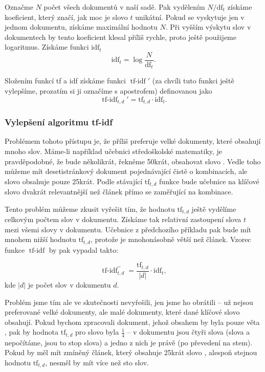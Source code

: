 \documentclass{article}
\DeclareMathOperator{\tfidf}{tf-idf}
\begin{document}
Označme $N$ počet všech dokumentů v naší sadě. Pak vydělením $N/\mbox{df}_t$ získáme koeficient, který značí, jak moc je slovo $t$ unikátní. Pokud se vyskytuje jen v jednom dokumentu, získáme maximální hodnotu $N$. Při vyšším výskytu slov v dokumentech by tento koeficient klesal příliš rychle, proto ještě použijeme logaritmus. Získáme funkci $\mbox{idf}_t$
$$\mbox{idf}_t=\log\frac{N}{\mbox{df}_t}.$$

Složením funkcí tf a idf získáme funkci $\tfidf'$ (za chvíli tuto funkci ještě vylepšíme, prozatím si ji označíme s apostrofem) definovanou jako
$$\tfidf_{t,d}'=\mbox{tf}_{t,d}\cdot\mbox{idf}_t.$$

\subsubsection{Vylepšení algoritmu tf-idf}

Problémem tohoto přístupu je, že příliš preferuje velké dokumenty, které obsahují mnoho slov. Máme-li například učebnici středoškolské matematiky, je pravděpodobné, že bude několikrát, řekněme 50krát, obsahovat slovo . Vedle toho můžeme mít desetistránkový dokument pojednávající čistě o kombinacích, ale slovo  obsahuje pouze 25krát. Podle stávající $\mbox{tf}_{t,d}$ funkce bude učebnice na klíčové slovo  dvakrát relevantnější než článek přímo se zaměřující na kombinace. 

Tento problém můžeme zkusit vyřešit tím, že hodnotu $\mbox{tf}_{t,d}$ ještě vydělíme celkovým počtem slov v dokumentu. Získáme tak relativní zastoupení slova $t$ mezi všemi slovy v dokumentu. Učebnice z předchozího příkladu pak bude mít mnohem nižší hodnotu $\mbox{tf}_{t,d}$, protože je mnohonásobně větší než článek. Vzorec funkce $\tfidf$ by pak vypadal takto:

$$
\tfidf_{t,d}^{\prime\prime} = \frac{\mbox{tf}_{t,d}}{|d|}\cdot\mbox{idf}_t,
$$
kde $|d|$ je počet slov v dokumentu $d$.

Problém jsme tím ale ve skutečnosti nevyřešili, jen jsme ho obrátili -- už nejsou preferované velké dokumenty, ale malé dokumenty, které dané klíčové slovo obsahují. Pokud bychom zpracovali dokument, jehož obsahem by byla pouze věta , pak by hodnota $\mbox{tf}_{t,d}$ pro slovo  byla $\frac14$ -- v dokumentu jsou čtyři slova (slova  a  nepočítáme, jsou to stop slova) a jedno z nich je právě  (po převedení na stem). Pokud by měl mít zmíněný článek, který obsahuje 25krát slovo , alespoň stejnou hodnotu $\mbox{tf}_{t,d}$, nesměl by mít více než sto slov. 
\end{document}
